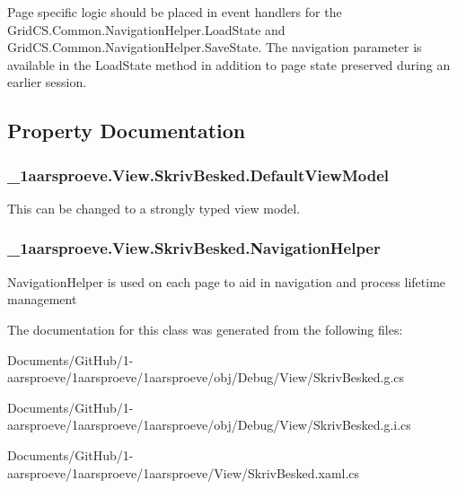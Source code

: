 Page specific logic should be placed in event handlers for the Grid\+C\+S.\+Common.\+Navigation\+Helper.\+Load\+State and Grid\+C\+S.\+Common.\+Navigation\+Helper.\+Save\+State. The navigation parameter is available in the Load\+State method in addition to page state preserved during an earlier session. 

\subsection{Property Documentation}
\hypertarget{class__1aarsproeve_1_1_view_1_1_skriv_besked_a32c4fc357cdba1138021e257dd545d53}{}
\subsubsection[{Default\+View\+Model}]{ \+\_\+1aarsproeve.\+View.\+Skriv\+Besked.\+Default\+View\+Model\hspace{0.3cm}{\ttfamily [get]}}\label{class__1aarsproeve_1_1_view_1_1_skriv_besked_a32c4fc357cdba1138021e257dd545d53}


This can be changed to a strongly typed view model. 

\hypertarget{class__1aarsproeve_1_1_view_1_1_skriv_besked_ad24c3da26e1cc62ddf5046f96f170dd7}{}
\subsubsection[{Navigation\+Helper}]{ \+\_\+1aarsproeve.\+View.\+Skriv\+Besked.\+Navigation\+Helper\hspace{0.3cm}{\ttfamily [get]}}\label{class__1aarsproeve_1_1_view_1_1_skriv_besked_ad24c3da26e1cc62ddf5046f96f170dd7}


Navigation\+Helper is used on each page to aid in navigation and process lifetime management 



The documentation for this class was generated from the following files\+:\begin{DoxyCompactItemize}
\item 
Documents/\+Git\+Hub/1-\/aarsproeve/1aarsproeve/1aarsproeve/obj/\+Debug/\+View/Skriv\+Besked.\+g.\+cs\item 
Documents/\+Git\+Hub/1-\/aarsproeve/1aarsproeve/1aarsproeve/obj/\+Debug/\+View/Skriv\+Besked.\+g.\+i.\+cs\item 
Documents/\+Git\+Hub/1-\/aarsproeve/1aarsproeve/1aarsproeve/\+View/Skriv\+Besked.\+xaml.\+cs\end{DoxyCompactItemize}
